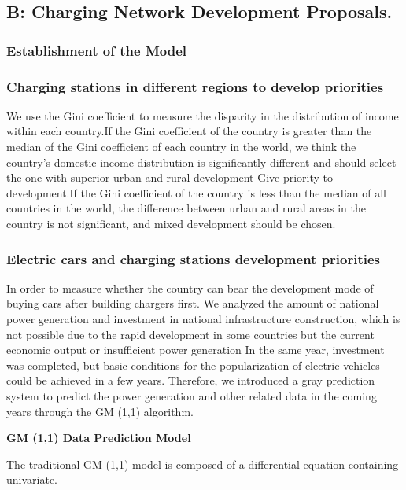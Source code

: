 \documentclass{mcmthesis}
\begin{document}
\subsection{B: Charging Network Development Proposals.}

\subsubsection{Establishment of the Model}

\subsubsection*{Charging stations in different regions to develop priorities}

\par We use the Gini coefficient to measure the disparity in the distribution of income within each country.If the Gini coefficient of the country is greater than the median of the Gini coefficient of each country in the world, we think the country's domestic income distribution is significantly different and should select the one with superior urban and rural development Give priority to development.If the Gini coefficient of the country is less than the median of all countries in the world, the difference between urban and rural areas in the country is not significant, and mixed development should be chosen.

\subsubsection*{Electric cars and charging stations development priorities}


\par In order to measure whether the country can bear the development mode of buying cars after building chargers first. We analyzed the amount of national power generation and investment in national infrastructure construction, which is not possible due to the rapid development in some countries but the current economic output or insufficient power generation In the same year, investment was completed, but basic conditions for the popularization of electric vehicles could be achieved in a few years. Therefore, we introduced a gray prediction system to predict the power generation and other related data in the coming years through the GM (1,1) algorithm.

\textbf{GM (1,1)  Data Prediction Model}

\par The traditional GM (1,1) model is composed of a differential equation containing univariate.
\end{document}
